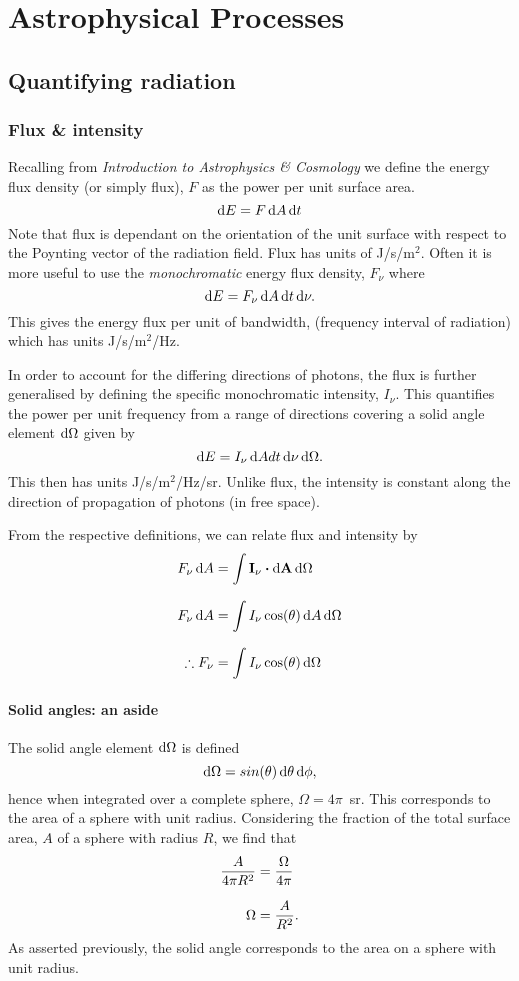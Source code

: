 \chapter{Astrophysical Processes}
\minitoc
\pagebreak
\section{Quantifying radiation}
\subsection{Flux \& intensity}
Recalling from \textit{Introduction to Astrophysics \& Cosmology} we define the energy flux density (or simply flux), $F$ as the power per unit surface area.
%
$$ \mathop{}\!\mathrm{d} E = F \mathop{}\!\mathrm{d} A \mathop{}\!\mathrm{d} t $$
%
Note that flux is dependant on the orientation of the unit surface with respect to the Poynting vector of the radiation field.
 Flux has units of J/s/m$^2$.
 Often it is more useful to use the \emph{monochromatic} energy flux density, $F_\nu$ where
%
$$ \mathop{}\!\mathrm{d} E = F_\nu \mathop{}\!\mathrm{d} A \mathop{}\!\mathrm{d} t \mathop{}\!\mathrm{d} \nu. $$
%
This gives the energy flux per unit of bandwidth, (frequency interval of radiation) which has units J/s/m$^2$/Hz.
\par 
In order to account for the differing directions of photons, the flux is further generalised by defining the specific monochromatic intensity, $I_\nu$.
 This quantifies the power per unit frequency from a range of directions covering a solid angle element $\mathop{}\!\mathrm{d} \Omega$ given by
%
$$ \mathop{}\!\mathrm{d} E = I_\nu \mathop{}\!\mathrm{d} A dt \mathop{}\!\mathrm{d} \nu \mathop{}\!\mathrm{d} \Omega. $$
%
This then has units J/s/m$^2$/Hz/sr.
 Unlike flux, the intensity is constant along the direction of propagation of photons (in free space).
\par
From the respective definitions, we can relate flux and intensity by
%
\begin{align*}
	F_\nu \diff A &= \int \mathbf{I_\nu} \dotp \mathbf{\diff A} \diff \Omega
	\linedrop
	F_\nu \diff A &= \int I_\nu \cos(\theta) \diff A \diff \Omega
	\linedrop
	\therefore F_\nu &= \int I_\nu \cos(\theta) \diff \Omega
\end{align*}
%

\subsubsection{Solid angles: an aside}
The solid angle element $\mathop{}\!\mathrm{d} \Omega$ is defined
%
$$ \mathop{}\!\mathrm{d} \Omega = sin(\theta) \mathop{}\!\mathrm{d} \theta \mathop{}\!\mathrm{d} \phi , $$
%
hence when integrated over a complete sphere, $\Omega = 4\pi$~sr.
 This corresponds to the area of a sphere with unit radius.
 Considering the fraction of the total surface area, $A$ of a sphere with radius $R$, we find that
%
\begin{align*}
	\frac{A}{4\pi R^2} &= \frac{\Omega}{4\pi}
	\linedrop
	\Omega &= \frac{A}{R^2}.
\end{align*}
%
As asserted previously, the solid angle corresponds to the area on a sphere with unit radius.
%
